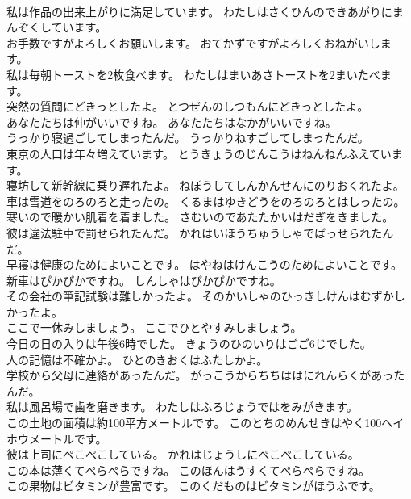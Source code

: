 \documentclass[8pt]{extreport}
\begin{document}
\begin{CJK}{UTF8}{min}
\\	私は作品の出来上がりに満足しています。	わたしはさくひんのできあがりにまんぞくしています。 
\\	お手数ですがよろしくお願いします。	おてかずですがよろしくおねがいします。 
\\	私は毎朝トーストを2枚食べます。	わたしはまいあさトーストを2まいたべます。 
\\	突然の質問にどきっとしたよ。	とつぜんのしつもんにどきっとしたよ。 
\\	あなたたちは仲がいいですね。	あなたたちはなかがいいですね。 
\\	うっかり寝過ごしてしまったんだ。	うっかりねすごしてしまったんだ。 
\\	東京の人口は年々増えています。	とうきょうのじんこうはねんねんふえています。 
\\	寝坊して新幹線に乗り遅れたよ。	ねぼうしてしんかんせんにのりおくれたよ。 
\\	車は雪道をのろのろと走ったの。	くるまはゆきどうをのろのろとはしったの。 
\\	寒いので暖かい肌着を着ました。	さむいのであたたかいはだぎをきました。 
\\	彼は違法駐車で罰せられたんだ。	かれはいほうちゅうしゃでばっせられたんだ。 
\\	早寝は健康のためによいことです。	はやねはけんこうのためによいことです。 
\\	新車はぴかぴかですね。	しんしゃはぴかぴかですね。 
\\	その会社の筆記試験は難しかったよ。	そのかいしゃのひっきしけんはむずかしかったよ。 
\\	ここで一休みしましょう。	ここでひとやすみしましょう。 
\\	今日の日の入りは午後6時でした。	きょうのひのいりはごご6じでした。 
\\	人の記憶は不確かよ。	ひとのきおくはふたしかよ。 
\\	学校から父母に連絡があったんだ。	がっこうからちちははにれんらくがあったんだ。 
\\	私は風呂場で歯を磨きます。	わたしはふろじょうではをみがきます。 
\\	この土地の面積は約100平方メートルです。	このとちのめんせきはやく100ヘイホウメートルです。 
\\	彼は上司にぺこぺこしている。	かれはじょうしにぺこぺこしている。 
\\	この本は薄くてぺらぺらですね。	このほんはうすくてぺらぺらですね。 
\\	この果物はビタミンが豊富です。	このくだものはビタミンがほうふです。 

\end{CJK}
\end{document}
